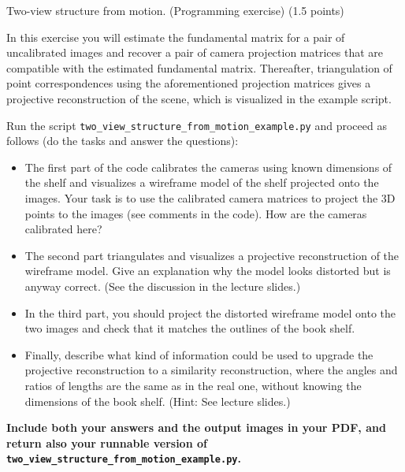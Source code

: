\documentclass[12pt]{article} %
\newenvironment{exercise}[2][Task]{\begin{trivlist}
\item[\hskip \labelsep {\bfseries #1}\hskip \labelsep {\bfseries #2.}]}{\end{trivlist}}
\begin{document}
\begin{exercise}{3}
	Two-view structure from motion. (Programming exercise) (1.5 points)
	
	\vspace{1mm}
	\noindent In this exercise you will estimate the fundamental matrix for a pair of uncalibrated images and recover a pair of camera projection matrices that are compatible with the estimated fundamental matrix. Thereafter, triangulation of point correspondences using the aforementioned projection matrices gives a projective reconstruction of the scene, which is visualized in the example script.
	
	\vspace{1mm}
	\noindent Run the script \texttt{two\_view\_structure\_from\_motion\_example.py} and proceed as follows (do the tasks and answer the questions):
	\begin{itemize}
		\item[\textit{a)}] The first part of the code calibrates the cameras using known dimensions of the shelf and visualizes a wireframe model of the shelf projected onto the images. Your task is to use the calibrated camera matrices to project the 3D points to the images (see comments in the code). How are the cameras calibrated here?
		
		\item[\textit{b)}] The second part triangulates and visualizes a projective reconstruction of the wireframe model. Give an explanation why the model looks distorted but is anyway correct. (See the discussion in the lecture slides.)
		\item[\textit{c)}] In the third part, you should project the distorted wireframe model onto the two images and check that it matches the outlines of the book shelf. 
		
		\item[\textit{d)}] Finally, describe what kind of information could be used to upgrade the projective reconstruction to a similarity reconstruction, where the angles and ratios of lengths are the same as in the real one, without knowing the dimensions of the book shelf. (Hint: See lecture slides.)
	\end{itemize}

  \noindent \textbf{Include both your answers and the output images in your PDF, and return also your runnable version
of \texttt{two\_view\_structure\_from\_motion\_example.py}.}
\end{exercise}
\end{document}

